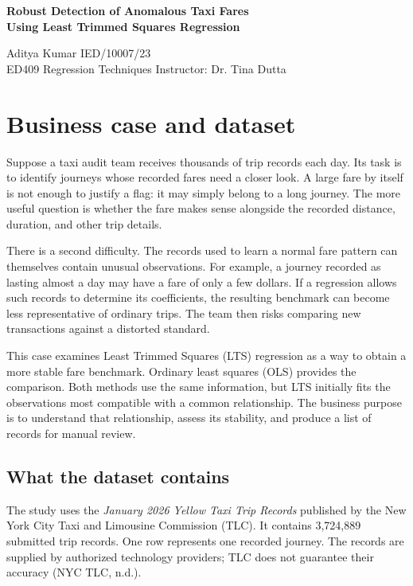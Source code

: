\documentclass[11pt,letterpaper]{article}
\begin{document}
\begin{center}
{\Large\bfseries Robust Detection of Anomalous Taxi Fares\\Using Least Trimmed Squares Regression\par}
\vspace{7pt}
Aditya Kumar \quad IED/10007/23\\
ED409 Regression Techniques \quad Instructor: Dr. Tina Dutta
\end{center}

\section*{Business case and dataset}
Suppose a taxi audit team receives thousands of trip records each day. Its task is to identify journeys whose recorded fares need a closer look. A large fare by itself is not enough to justify a flag: it may simply belong to a long journey. The more useful question is whether the fare makes sense alongside the recorded distance, duration, and other trip details.

There is a second difficulty. The records used to learn a normal fare pattern can themselves contain unusual observations. For example, a journey recorded as lasting almost a day may have a fare of only a few dollars. If a regression allows such records to determine its coefficients, the resulting benchmark can become less representative of ordinary trips. The team then risks comparing new transactions against a distorted standard.

This case examines Least Trimmed Squares (LTS) regression as a way to obtain a more stable fare benchmark. Ordinary least squares (OLS) provides the comparison. Both methods use the same information, but LTS initially fits the observations most compatible with a common relationship. The business purpose is to understand that relationship, assess its stability, and produce a list of records for manual review.

\subsection*{What the dataset contains}
The study uses the \emph{January 2026 Yellow Taxi Trip Records} published by the New York City Taxi and Limousine Commission (TLC). It contains 3,724,889 submitted trip records. One row represents one recorded journey. The records are supplied by authorized technology providers; TLC does not guarantee their accuracy (NYC TLC, n.d.).
\end{document}
